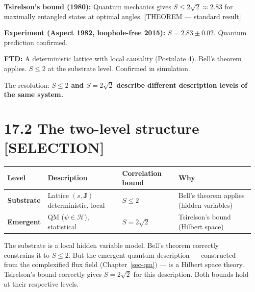 \documentclass[
  11pt,
  letterpaper,
  twoside,
  openright]{book}
\begin{document}
\textbf{Tsirelson's bound (1980):} Quantum mechanics gives
\(S \leq 2\sqrt{2} \approx 2.83\) for maximally entangled states at
optimal angles. {[}THEOREM --- standard result{]}

\textbf{Experiment (Aspect 1982, loophole-free 2015):}
\(S = 2.83 \pm 0.02\). Quantum prediction confirmed.

\textbf{FTD:} A deterministic lattice with local causality (Postulate
4). Bell's theorem applies. \(S \leq 2\) at the substrate level.
Confirmed in simulation.

The resolution: \textbf{\(S \leq 2\) and \(S = 2\sqrt{2}\) describe
different description levels of the same system.}

\section{17.2 The two-level structure
{[}SELECTION{]}}\label{the-two-level-structure-selection}

\begin{longtable}[]{@{}
  >{\raggedright\arraybackslash}p{}
  >{\raggedright\arraybackslash}p{}
  >{\raggedright\arraybackslash}p{}
  >{\raggedright\arraybackslash}p{}@{}}
\toprule\noalign{}
\begin{minipage}[b]{\linewidth}\raggedright
Level
\end{minipage} & \begin{minipage}[b]{\linewidth}\raggedright
Description
\end{minipage} & \begin{minipage}[b]{\linewidth}\raggedright
Correlation bound
\end{minipage} & \begin{minipage}[b]{\linewidth}\raggedright
Why
\end{minipage} \\
\midrule\noalign{}
\endhead
\bottomrule\noalign{}
\endlastfoot
\textbf{Substrate} & Lattice \((s, \mathbf{J})\) deterministic, local &
\(S \leq 2\) & Bell's theorem applies (hidden variables) \\
\textbf{Emergent} & QM (\(\psi \in \mathcal{H}\)), statistical &
\(S = 2\sqrt{2}\) & Tsirelson's bound (Hilbert space) \\
\end{longtable}

The substrate is a local hidden variable model. Bell's theorem correctly
constrains it to \(S \leq 2\). But the emergent quantum description ---
constructed from the complexified flux field (Chapter~\ref{sec-qm}) ---
is a Hilbert space theory. Tsirelson's bound correctly gives
\(S = 2\sqrt{2}\) for this description. Both bounds hold at their
respective levels.
\end{document}
